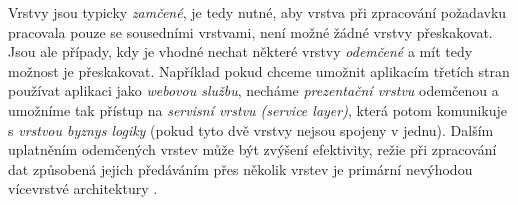 Vrstvy jsou typicky \textit{zamčené}, je tedy nutné, aby vrstva při zpracování požadavku pracovala pouze se sousedními vrstvami, není možné žádné vrstvy přeskakovat. Jsou ale případy, kdy je vhodné nechat některé vrstvy \textit{odemčené} a mít tedy možnost je přeskakovat. Například pokud chceme umožnit aplikacím třetích stran používat aplikaci jako \textit{webovou službu}, necháme \textit{prezentační vrstvu} odemčenou a umožníme tak přístup na \textit{servisní vrstvu (service layer)}, která potom komunikuje s \textit{vrstvou byznys logiky} (pokud tyto dvě vrstvy nejsou spojeny v jednu). Dalším uplatněním odemčených vrstev může být zvýšení efektivity, režie při zpracování dat způsobená  jejich předáváním přes několik vrstev je primární nevýhodou vícevrstvé architektury \cite{Clark90}. 







